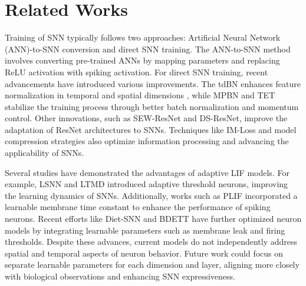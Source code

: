 \section{Related Works}
Training of SNN typically follows two approaches: Artificial Neural Network (ANN)-to-SNN conversion and direct SNN training. The ANN-to-SNN method involves converting pre-trained ANNs by mapping parameters and replacing ReLU activation with spiking activation. 
For direct SNN training, recent advancements have introduced various improvements. The tdBN \cite{zheng_going_2021} enhances feature normalization in temporal and spatial dimensions , while MPBN \cite{guo_membrane_2023} and TET stabilize the training process through better batch normalization and momentum control. 
Other innovations, such as SEW-ResNet and DS-ResNet, improve the adaptation of ResNet architectures to SNNs\cite{fang_deep_2021,feng_multi-level_2022,hu_advancing_2024}. 
Techniques like IM-Loss \cite{guo_im-loss_2022} and model compression strategies also optimize information processing and advancing the applicability of SNNs\cite{xu_constructing_2023}.

Several studies have demonstrated the advantages of adaptive LIF models\cite{chen_gradual_2022,liu_event-based_2022}. For example, LSNN \cite{bellec_long_2018} and LTMD\cite{wang_ltmd_2022} introduced adaptive threshold neurons, improving the learning dynamics of SNNs. Additionally, works such as PLIF incorporated a learnable membrane time constant to enhance the performance of spiking neurons\cite{fang_incorporating_2021}. Recent efforts like Diet-SNN and BDETT have further optimized neuron models by integrating learnable parameters such as membrane leak and firing thresholds\cite{rathi_diet-snn_2023,ding_biologically_2022,xu2024rsnn}.
Despite these advances, current models do not independently address spatial and temporal aspects of neuron behavior. Future work could focus on separate learnable parameters for each dimension and layer, aligning more closely with biological observations and enhancing SNN expressiveness.